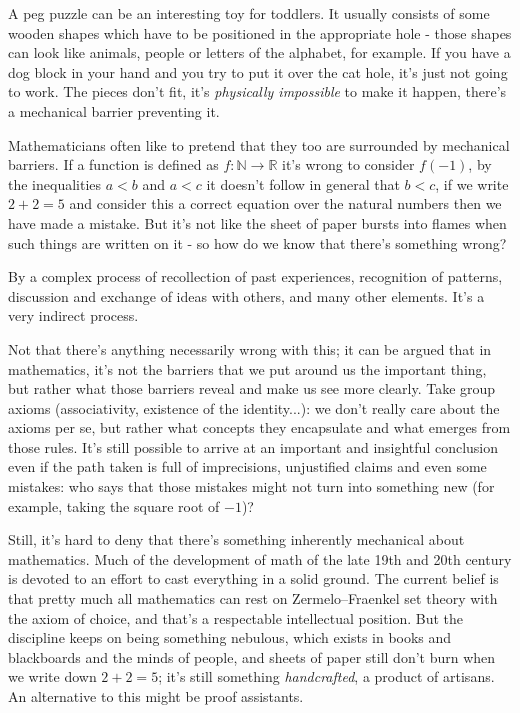 \documentclass{book}
\theoremstyle{definition}
\theoremstyle{remark}
\theoremstyle{plain}
\newcommand{\NN}{\mathbb{N}}
\newcommand{\RR}{\mathbb{R}}
\begin{document}
A peg puzzle can be an interesting toy for toddlers.
It usually consists of some wooden shapes which have to be
positioned in the appropriate hole - those shapes can look like animals, people or letters of the alphabet, for example.
If you have a dog block in your hand and you try to put it over the cat hole,
it's just not going to work. The pieces don't fit, it's \textit{physically impossible} to make it happen,
there's a mechanical barrier preventing it.

Mathematicians often like to pretend that they too are surrounded by mechanical barriers.
If a function is defined as $f : \NN \to \RR$ it's wrong to consider $f(-1)$,
by the inequalities $a < b$ and $a < c$ it doesn't follow in general that $b < c$,
if we write $2 + 2 = 5$ and consider this a correct equation over the natural numbers then we have made a mistake.
But it's not like the sheet of paper bursts into flames when such things are written on it -
so how do we know that there's something wrong?

By a complex process of recollection of past experiences, recognition of patterns,
discussion and exchange of ideas with others, and many other elements.
It's a very indirect process.

Not that there's anything necessarily wrong with this;
it can be argued that in mathematics, it's not the barriers that we put around us the important thing,
but rather what those barriers reveal and make us see more clearly.
Take group axioms (associativity, existence of the identity...): we don't really care about the axioms per se,
but rather what concepts they encapsulate and what emerges from those rules.
It's still possible to arrive at an important and insightful conclusion even if the path taken
is full of imprecisions, unjustified claims and even some mistakes:
who says that those mistakes might not turn into something new (for example, taking the square root of $-1$)?

Still, it's hard to deny that there's something inherently mechanical about mathematics.
Much of the development of math of the late 19th and 20th century is devoted to an effort to
cast everything in a solid ground. The current belief is that pretty much all mathematics can rest on Zermelo–Fraenkel set theory
with the axiom of choice, and that's a respectable intellectual position.
But the discipline keeps on being something nebulous, which exists in books and blackboards and the minds of people,
and sheets of paper still don't burn when we write down $2 + 2 = 5$; it's still something \textit{handcrafted}, a product of artisans.
\newpage
An alternative to this might be proof assistants.
\end{document}
